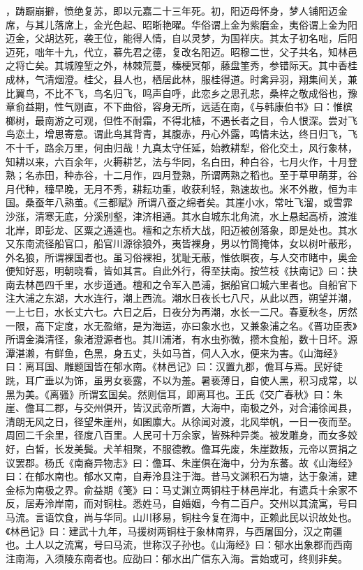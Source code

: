 \documentclass[12pt,UTF8]{ctexbook}
\begin{document}
，踌蹰崩擗，愤绝复苏，即以元嘉二十三年死。初，阳迈母怀身，梦人铺阳迈金席，与其儿落席上，金光色起、昭晣艳曜。华俗谓上金为紫磨金，夷俗谓上金为阳迈金，父胡达死，袭王位，能得人情，自以灵梦，为国祥庆。其太子初名咄，后阳迈死，咄年十九，代立，慕先君之德，复改名阳迈。昭穆二世，父子共名，知林邑之将亡矣。其城隍堑之外，林棘荒蔓，榛梗冥郁，藤盘筀秀，参错际天。其中香桂成林，气清烟澄。桂父，县人也，栖居此林，服桂得道。时禽异羽，翔集间关，兼比翼鸟，不比不飞，鸟名归飞，鸣声自呼，此恋乡之思孔悲，桑梓之敬成俗也，豫章俞益期，性气刚直，不下曲俗，容身无所，远适在南，《与韩康伯书》曰：惟槟榔树，最南游之可观，但性不耐霜，不得北植，不遇长者之目，令人恨深。尝对飞鸟恋土，增思寄意。谓此鸟其背青，其腹赤，丹心外露，鸣情未达，终日归飞，飞不十千，路余万里，何由归哉！九真太守任延，始教耕犁，俗化交土，风行象林，知耕以来，六百余年，火耨耕艺，法与华同，名白田，种白谷，七月火作，十月登熟；名赤田，种赤谷，十二月作，四月登熟，所谓两熟之稻也。至于草甲萌芽，谷月代种，穜早晚，无月不秀，耕耘功重，收获利轻，熟速故也。米不外散，恒为丰国。桑蚕年八熟茧。《三都赋》所谓八蚕之绵者矣。其崖小水，常吐飞溜，或雪霏沙涨，清寒无底，分溪别壑，津济相通。其水自城东北角流，水上悬起高桥，渡淮北岸，即彭龙、区粟之通逵也。檀和之东桥大战，阳迈被创落象，即是处也。其水又东南流径船官口，船官川源徐狼外，夷皆裸身，男以竹筒掩体，女以树叶蔽形，外名狼，所谓裸国者也。虽习俗裸袒，犹耻无蔽，惟依瞑夜，与人交市睹中，奥金便知好恶，明朝晓看，皆如其言。自此外行，得至扶南。按竺枝《扶南记》曰：抉南去林邑四千里，水步道通。檀和之令军入邑浦，据船官口城六里者也。自船官下注大浦之东湖，大水连行，潮上西流。潮水日夜长七八尺，从此以西，朔望并潮，一上七日，水长丈六七。六日之后，日夜分为再潮，水长一二尺。春夏秋冬，厉然一限，高下定度，水无盈缩，是为海运，亦曰象水也，又兼象浦之名。《晋功臣表》所谓金潾清径，象渚澄源者也。其川浦渚，有水虫弥微，攒木食船，数十日坏。源潭湛濑，有鲜鱼，色黑，身五丈，头如马首，伺人入水，便来为害。《山海经》曰：离耳国、雕题国皆在郁水南。《林邑记》曰：汉置九郡，儋耳与焉。民好徒跣，耳广垂以为饰，虽男女亵露，不以为羞。暑亵薄日，自使人黑，积习成常，以黑为美。《离骚》所谓玄国矣。然则信耳，即离耳也。王氏《交广春秋》曰：朱崖、儋耳二郡，与交州俱开，皆汉武帝所置，大海中，南极之外，对合浦徐闻县，清朗无风之日，径望朱崖州，如囷廪大。从徐闻对渡，北风举帆，一日一夜而至。周回二千余里，径度八百里。人民可十万余家，皆殊种异类。被发雕身，而女多姣好，白皙，长发美鬓。犬羊相聚，不服德教。儋耳先废，朱崖数叛，元帝以贾捐之议罢郡。杨氏《南裔异物志》曰：儋耳、朱崖俱在海中，分为东蕃。故《山海经》曰：在郁水南也。郁水又南，自寿泠县注于海。昔马文渊积石为塘，达于象浦，建金标为南极之界。俞益期《笺》曰：马丈渊立两铜柱于林邑岸北，有遗兵十余家不反，居寿泠岸南，而对铜柱。悉姓马，自婚姻，今有二百户。交州以其流寓，号曰马流。言语饮食，尚与华同。山川移易，铜柱今复在海中，正赖此民以识故处也。《林邑记》曰：建武十九年，马援树两铜柱于象林南界，与西屠国分，汉之南疆也。土人以之流寓，号曰马流，世称汉子孙也。《山海经》曰：郁水出象郡而西南注南海，入须陵东南者也。应劭曰：郁水出广信东入海。言始或可，终则非矣。
\end{document}
